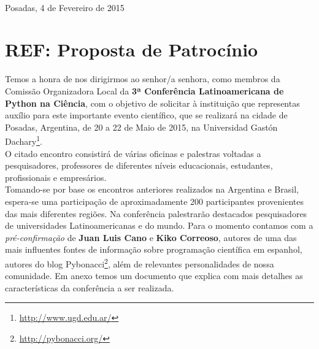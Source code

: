 \documentclass[11pt,a4paper]{report}
\begin{document}
\begin{center}
\end{center}



\hfill \\ Posadas, 4 de Fevereiro de 2015\\[0.1cm]

\section*{REF: Proposta de Patrocínio}

Temos a honra de nos dirigirmos ao senhor/a senhora, como membros da Comissão Organizadora Local da
\textbf{3ª Conferência Latinoamericana de Python na Ciência}, com o objetivo de solicitar
à instituição que representas auxílio para este importante evento científico, que se realizará na cidade
de Posadas, Argentina, de 20 a 22 de Maio de 2015, na Universidad Gastón Dachary\footnote{\url{http://www.ugd.edu.ar/}}. \\[0.1cm]

O citado encontro consistirá de várias oficinas e palestras voltadas a
pesquisadores, professores de diferentes níveis educacionais,
estudantes, profissionais e empresários. \\[0.1cm]

Tomando-se por base os encontros anteriores realizados na Argentina e
Brasil, espera-se uma participação de aproximadamente 200 participantes
provenientes das mais diferentes regiões. Na conferência
palestrarão destacados pesquisadores de universidades Latinoamericanas e
do mundo. Para o momento contamos com a \emph{pré-confirmação} de
\textbf{Juan Luis Cano} e \textbf{Kiko Correoso}, autores de uma das
mais influentes fontes de informação sobre programação científica em espanhol,
autores do blog Pybonacci\footnote{\url{http://pybonacci.org/}}, além
de relevantes personalidades de nossa comunidade. Em anexo temos um documento
que explica com mais detalhes as características da
conferência a ser realizada.\\[0.1cm]
\end{document}
